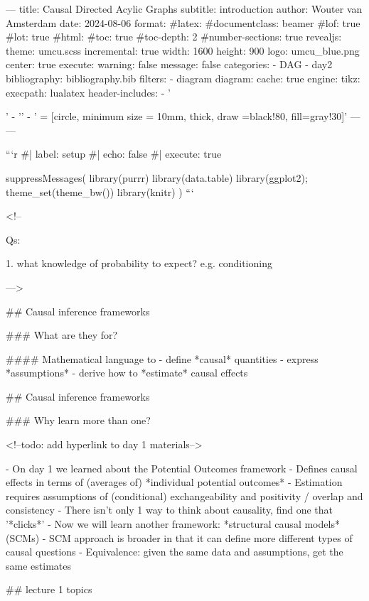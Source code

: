 ---
title: Causal Directed Acylic Graphs
subtitle: introduction
author: Wouter van Amsterdam
date: 2024-08-06
format: 
    #latex:
        #documentclass: beamer
        #lof: true
        #lot: true
    #html:
        #toc: true
        #toc-depth: 2
        #number-sections: true
    revealjs:
        theme: umcu.scss
        incremental: true
        width: 1600
        height: 900
        logo: umcu_blue.png
        center: true
execute:
    warning: false
    message: false
categories:
    - DAG
    - day2
bibliography: bibliography.bib
filters:
    - diagram
diagram:
  cache: true
  engine:
    tikz:
      execpath: lualatex
      header-includes:
        - '\usepackage{adjustbox}'
        - '\usetikzlibrary{arrows, shapes, positioning}'
        - ' = [circle, minimum size = 10mm, thick, draw =black!80, fill=gray!30]'
---
---

```{r}
#| label: setup
#| echo: false
#| execute: true

suppressMessages({
  library(purrr)
  library(data.table)
  library(ggplot2); theme_set(theme_bw())
  library(knitr)
})
```


<!--

Qs:

1. what knowledge of probability to expect? e.g. conditioning

--->

## Causal inference frameworks

### What are they for?

#### Mathematical language to
  - define *causal* quantities
  - express *assumptions*
  - derive how to *estimate* causal effects

## Causal inference frameworks

### Why learn more than one?

<!--todo: add hyperlink to day 1 materials-->

- On day 1 we learned about the Potential Outcomes framework
    - Defines causal effects in terms of (averages of) *individual potential outcomes*
    - Estimation requires assumptions of (conditional) exchangeability and positivity / overlap and consistency
- There isn't only 1 way to think about causality, find one that '*clicks*'
- Now we will learn another framework: *structural causal models* (SCMs)
    - SCM approach is broader in that it can define more different types of causal questions
- Equivalence: given the same data and assumptions, get the same estimates

## lecture 1 topics


